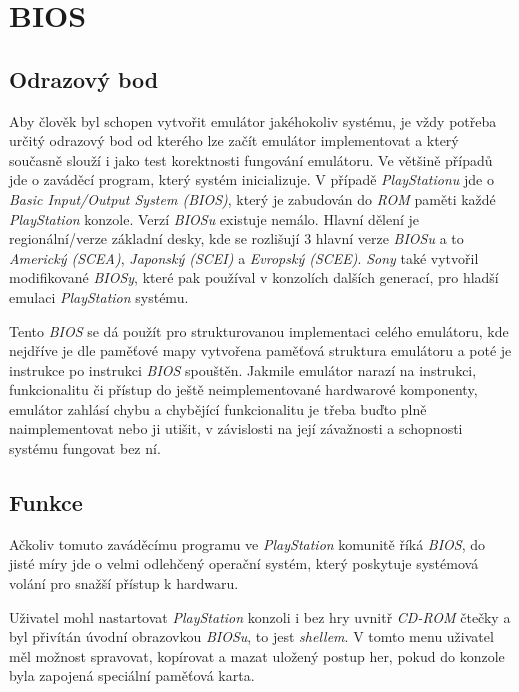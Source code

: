\chapter{BIOS}

\section{Odrazový bod}

Aby člověk byl schopen vytvořit emulátor jakéhokoliv systému, je vždy potřeba určitý odrazový bod od kterého lze
začít emulátor implementovat a který současně slouží i jako test korektnosti fungování emulátoru. Ve většině případů jde o zaváděcí
program, který systém inicializuje. V případě \textit{PlayStationu} jde o \textit{Basic Input/Output System (BIOS)},
který je zabudován do \textit{ROM} paměti každé \textit{PlayStation} konzole. Verzí \textit{BIOSu}
existuje nemálo. Hlavní dělení je regionální/verze základní desky, kde se rozlišují 3 hlavní verze \textit{BIOSu} a to
\textit{Americký (SCEA)}, \textit{Japonský (SCEI)} a \textit{Evropský (SCEE)}. \textit{Sony} také
vytvořil modifikované \textit{BIOSy}, které pak používal v konzolích dalších generací, pro hladší
emulaci \textit{PlayStation} systému.

Tento \textit{BIOS} se dá použít pro strukturovanou implementaci celého emulátoru, kde nejdříve je dle
paměťové mapy vytvořena paměťová struktura emulátoru a poté je instrukce po instrukci \textit{BIOS} spouštěn.
Jakmile emulátor narazí na instrukci, funkcionalitu či přístup do ještě neimplementované hardwarové komponenty,
emulátor zahlásí chybu a chybějící funkcionalitu je třeba buďto plně naimplementovat nebo ji utišit, v závislosti
na její závažnosti a schopnosti systému fungovat bez ní.

\section{Funkce}

Ačkoliv tomuto zaváděcímu programu ve \textit{PlayStation} komunitě říká \textit{BIOS}, do jisté
míry jde o velmi odlehčený operační systém, který poskytuje systémová volání pro snažší přístup k
hardwaru.

Uživatel mohl nastartovat \textit{PlayStation} konzoli i bez hry uvnitř \textit{CD-ROM} čtečky a byl přivítán
úvodní obrazovkou \textit{BIOSu}, to jest \textit{shellem}. V tomto menu uživatel měl možnost spravovat, kopírovat a mazat uložený postup her, pokud
do konzole byla zapojená speciální paměťová karta.

